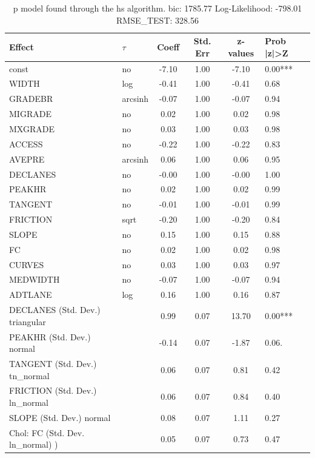 \begin{table}
	\caption{p model found through the hs algorithm. bic: 1785.77 Log-Likelihood: -798.01 RMSE_TEST: 328.56}
	\begin{center}
		\begin{tabular}{|l|l|c|c|c|l|}
			\hline
			Effect & $\tau$ & Coeff & Std. Err & z-values & Prob |z|>Z \\
			\hline
			const & no & -7.10 & 1.00 & -7.10 & 0.00*** \\
			\hline
			WIDTH & log & -0.41 & 1.00 & -0.41 & 0.68 \\
			\hline
			GRADEBR & arcsinh & -0.07 & 1.00 & -0.07 & 0.94 \\
			\hline
			MIGRADE & no & 0.02 & 1.00 & 0.02 & 0.98 \\
			\hline
			MXGRADE & no & 0.03 & 1.00 & 0.03 & 0.98 \\
			\hline
			ACCESS & no & -0.22 & 1.00 & -0.22 & 0.83 \\
			\hline
			AVEPRE & arcsinh & 0.06 & 1.00 & 0.06 & 0.95 \\
			\hline
			DECLANES & no & -0.00 & 1.00 & -0.00 & 1.00 \\
			\hline
			PEAKHR & no & 0.02 & 1.00 & 0.02 & 0.99 \\
			\hline
			TANGENT & no & -0.01 & 1.00 & -0.01 & 0.99 \\
			\hline
			FRICTION & sqrt & -0.20 & 1.00 & -0.20 & 0.84 \\
			\hline
			SLOPE & no & 0.15 & 1.00 & 0.15 & 0.88 \\
			\hline
			FC & no & 0.02 & 1.00 & 0.02 & 0.98 \\
			\hline
			CURVES & no & 0.03 & 1.00 & 0.03 & 0.97 \\
			\hline
			MEDWIDTH & no & -0.07 & 1.00 & -0.07 & 0.94 \\
			\hline
			ADTLANE & log & 0.16 & 1.00 & 0.16 & 0.87 \\
			\hline
			DECLANES (Std. Dev.) triangular &  & 0.99 & 0.07 & 13.70 & 0.00*** \\
			\hline
			PEAKHR (Std. Dev.) normal &  & -0.14 & 0.07 & -1.87 & 0.06. \\
			\hline
			TANGENT (Std. Dev.) tn_normal &  & 0.06 & 0.07 & 0.81 & 0.42 \\
			\hline
			FRICTION (Std. Dev.) ln_normal &  & 0.06 & 0.07 & 0.84 & 0.40 \\
			\hline
			SLOPE (Std. Dev.) normal &  & 0.08 & 0.07 & 1.11 & 0.27 \\
			\hline
			 Chol: FC (Std. Dev. ln_normal) ) &  & 0.05 & 0.07 & 0.73 & 0.47 \\

\end{tabular}
\end{center}
\end{table}
